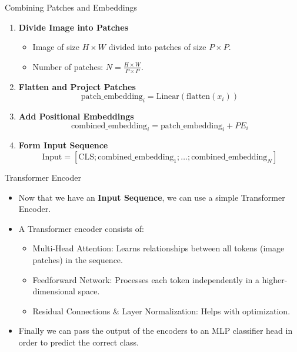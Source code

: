 \begin{frame}{Combining Patches and Embeddings}
    \begin{enumerate}
        \item \textbf{Divide Image into Patches}
        \begin{itemize}
            \item Image of size \( H \times W \) divided into patches of size \( P \times P \).
            \item Number of patches: \( N = \frac{H \times W}{P \times P} \).
        \end{itemize}
        \item \textbf{Flatten and Project Patches}
            \[
            \text{patch\_embedding}_i = \text{Linear}(\text{flatten}(x_i))
            \]
        \item \textbf{Add Positional Embeddings}
           \[
            \text{combined\_embedding}_i = \text{patch\_embedding}_i + PE_i
            \]
        \item \textbf{Form Input Sequence}
            \[
            \text{Input} = [\text{CLS}; \text{combined\_embedding}_1; \ldots; \text{combined\_embedding}_N]
            \]
    \end{enumerate}
\end{frame}


\begin{frame}{Transformer Encoder}
    \begin{itemize}
        \item Now that we have an \textbf{Input Sequence}, we can use a simple Transformer Encoder.
        \item A Transformer encoder consists of:
        \begin{itemize}
            \item  Multi-Head Attention: Learns relationships between all tokens (image patches) in the sequence.
        	\item Feedforward Network: Processes each token independently in a higher-dimensional space.
	        \item Residual Connections \& Layer Normalization: Helps with optimization.
        \end{itemize}
        \item Finally we can pass the output of the encoders to an MLP classifier head in order to predict the correct class.
    \end{itemize}
\end{frame}

